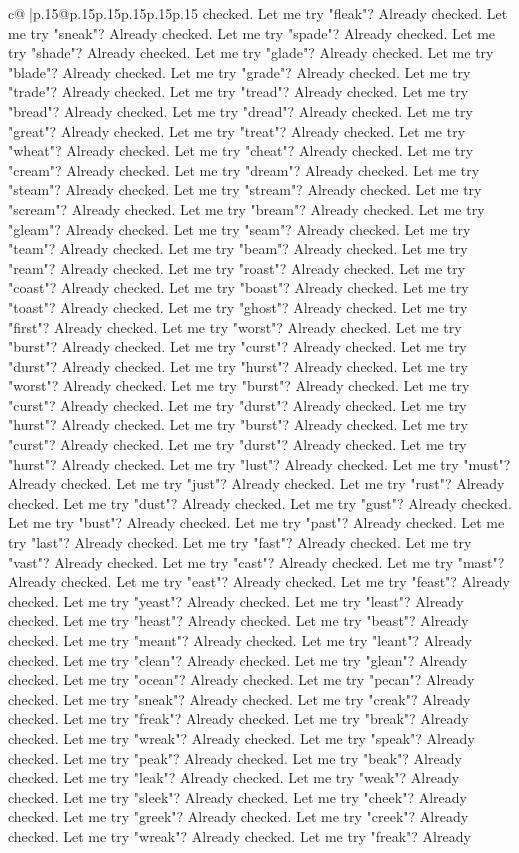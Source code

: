 \documentclass{article}
\begin{document}
{\begin{supertabular}{c@{$\;$}|p{.15\linewidth}@{}p{.15\linewidth}p{.15\linewidth}p{.15\linewidth}p{.15\linewidth}p{.15\linewidth}}
{{{checked. Let me try "fleak"? Already checked. Let me try "sneak"? Already checked. Let me try "spade"? Already checked. Let me try "shade"? Already checked. Let me try "glade"? Already checked. Let me try "blade"? Already checked. Let me try "grade"? Already checked. Let me try "trade"? Already checked. Let me try "tread"? Already checked. Let me try "bread"? Already checked. Let me try "dread"? Already checked. Let me try "great"? Already checked. Let me try "treat"? Already checked. Let me try "wheat"? Already checked. Let me try "cheat"? Already checked. Let me try "cream"? Already checked. Let me try "dream"? Already checked. Let me try "steam"? Already checked. Let me try "stream"? Already checked. Let me try "scream"? Already checked. Let me try "bream"? Already checked. Let me try "gleam"? Already checked. Let me try "seam"? Already checked. Let me try "team"? Already checked. Let me try "beam"? Already checked. Let me try "ream"? Already checked. Let me try "roast"? Already checked. Let me try "coast"? Already checked. Let me try "boast"? Already checked. Let me try "toast"? Already checked. Let me try "ghost"? Already checked. Let me try "first"? Already checked. Let me try "worst"? Already checked. Let me try "burst"? Already checked. Let me try "curst"? Already checked. Let me try "durst"? Already checked. Let me try "hurst"? Already checked. Let me try "worst"? Already checked. Let me try "burst"? Already checked. Let me try "curst"? Already checked. Let me try "durst"? Already checked. Let me try "hurst"? Already checked. Let me try "burst"? Already checked. Let me try "curst"? Already checked. Let me try "durst"? Already checked. Let me try "hurst"? Already checked. Let me try "lust"? Already checked. Let me try "must"? Already checked. Let me try "just"? Already checked. Let me try "rust"? Already checked. Let me try "dust"? Already checked. Let me try "gust"? Already checked. Let me try "bust"? Already checked. Let me try "past"? Already checked. Let me try "last"? Already checked. Let me try "fast"? Already checked. Let me try "vast"? Already checked. Let me try "cast"? Already checked. Let me try "mast"? Already checked. Let me try "east"? Already checked. Let me try "feast"? Already checked. Let me try "yeast"? Already checked. Let me try "least"? Already checked. Let me try "heast"? Already checked. Let me try "beast"? Already checked. Let me try "meant"? Already checked. Let me try "leant"? Already checked. Let me try "clean"? Already checked. Let me try "glean"? Already checked. Let me try "ocean"? Already checked. Let me try "pecan"? Already checked. Let me try "sneak"? Already checked. Let me try "creak"? Already checked. Let me try "freak"? Already checked. Let me try "break"? Already checked. Let me try "wreak"? Already checked. Let me try "speak"? Already checked. Let me try "peak"? Already checked. Let me try "beak"? Already checked. Let me try "leak"? Already checked. Let me try "weak"? Already checked. Let me try "sleek"? Already checked. Let me try "cheek"? Already checked. Let me try "greek"? Already checked. Let me try "creek"? Already checked. Let me try "wreak"? Already checked. Let me try "freak"? Already }}}
\end{supertabular}}
\end{document}
